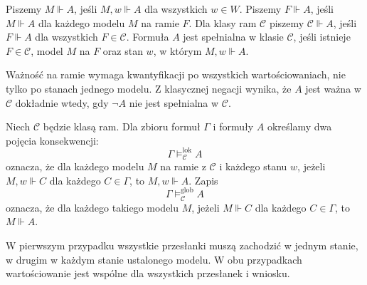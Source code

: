 \begin{definicja}
\label{def:ncl-kripke-validity}
Piszemy $M\Vdash A$, jeśli $M,w\Vdash A$
dla wszystkich $w\in W$.
Piszemy $F\Vdash A$, jeśli $M\Vdash A$
dla każdego modelu $M$ na ramie $F$.
Dla klasy ram $\mathcal C$ piszemy
$\mathcal C\Vdash A$, jeśli $F\Vdash A$
dla wszystkich $F\in\mathcal C$.
Formuła $A$ jest spełnialna w klasie
$\mathcal C$, jeśli istnieje $F\in\mathcal C$,
model $M$ na $F$ oraz stan $w$, w którym
$M,w\Vdash A$.
\end{definicja}
Ważność na ramie wymaga kwantyfikacji po
wszystkich wartościowaniach, nie tylko po
stanach jednego modelu. Z klasycznej negacji
wynika, że $A$ jest ważna w $\mathcal C$
dokładnie wtedy, gdy $\neg A$ nie jest
spełnialna w $\mathcal C$.

\begin{definicja}
\label{def:ncl-kripke-consequence}
Niech $\mathcal C$ będzie klasą ram.
Dla zbioru formuł $\Gamma$ i formuły $A$
określamy dwa pojęcia konsekwencji:
\[
 \Gamma\models_{\mathcal C}^{\mathrm{lok}} A
\]
oznacza, że dla każdego modelu $M$ na ramie
z $\mathcal C$ i każdego stanu $w$,
jeżeli $M,w\Vdash C$ dla każdego $C\in\Gamma$,
to $M,w\Vdash A$.
Zapis
\[
 \Gamma\models_{\mathcal C}^{\mathrm{glob}} A
\]
oznacza, że dla każdego takiego modelu $M$,
jeżeli $M\Vdash C$ dla każdego $C\in\Gamma$,
to $M\Vdash A$.
\end{definicja}
W pierwszym przypadku wszystkie przesłanki
muszą zachodzić w jednym stanie, w drugim
w każdym stanie ustalonego modelu.
W obu przypadkach wartościowanie jest wspólne
dla wszystkich przesłanek i wniosku.

